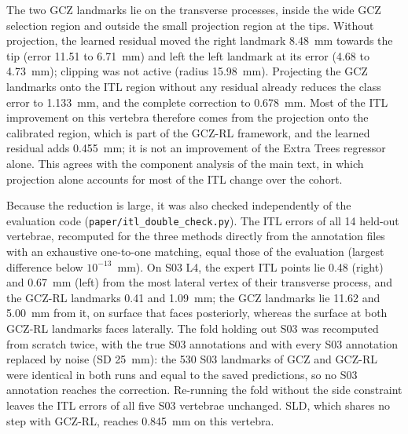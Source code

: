 \documentclass[10pt,a4paper]{article}
\begin{document}
The two GCZ landmarks lie on the transverse processes, inside the wide GCZ selection region and outside the small projection region at the tips. Without projection, the learned residual moved the right landmark 8.48~mm towards the tip (error 11.51 to 6.71~mm) and left the left landmark at its error (4.68 to 4.73~mm); clipping was not active (radius 15.98~mm). Projecting the GCZ landmarks onto the ITL region without any residual already reduces the class error to 1.133~mm, and the complete correction to 0.678~mm. Most of the ITL improvement on this vertebra therefore comes from the projection onto the calibrated region, which is part of the GCZ-RL framework, and the learned residual adds 0.455~mm; it is not an improvement of the Extra Trees regressor alone. This agrees with the component analysis of the main text, in which projection alone accounts for most of the ITL change over the cohort.

Because the reduction is large, it was also checked independently of the evaluation code (\texttt{paper/itl\_double\_check.py}). The ITL errors of all 14 held-out vertebrae, recomputed for the three methods directly from the annotation files with an exhaustive one-to-one matching, equal those of the evaluation (largest difference below $10^{-13}$~mm). On S03 L4, the expert ITL points lie 0.48 (right) and 0.67~mm (left) from the most lateral vertex of their transverse process, and the GCZ-RL landmarks 0.41 and 1.09~mm; the GCZ landmarks lie 11.62 and 5.00~mm from it, on surface that faces posteriorly, whereas the surface at both GCZ-RL landmarks faces laterally. The fold holding out S03 was recomputed from scratch twice, with the true S03 annotations and with every S03 annotation replaced by noise (SD 25~mm): the 530 S03 landmarks of GCZ and GCZ-RL were identical in both runs and equal to the saved predictions, so no S03 annotation reaches the correction. Re-running the fold without the side constraint leaves the ITL errors of all five S03 vertebrae unchanged. SLD, which shares no step with GCZ-RL, reaches 0.845~mm on this vertebra.
\end{document}
